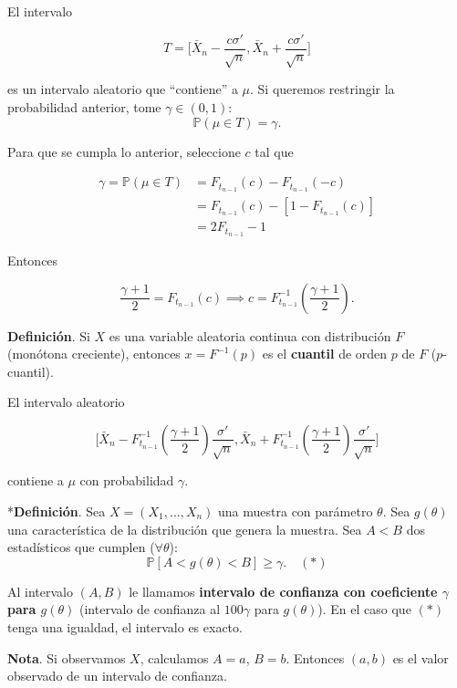 \documentclass[
  12pt,
]{book}
\begin{document}
El intervalo

\begin{equation*}
T = \bigg[\bar X_n - \dfrac{c\sigma'}{\sqrt n},\bar X_n + \dfrac{c\sigma'}{\sqrt
n}\bigg]
\end{equation*}

es un intervalo aleatorio que ``contiene'' a \(\mu\). Si queremos restringir la
probabilidad anterior, tome \(\gamma \in (0,1)\): \[ \mathbb P(\mu\in T) = \gamma. \]

Para que se cumpla lo anterior, seleccione \(c\) tal que

\begin{align*} \gamma = \mathbb P( \mu \in T) & = F_{t_{n-1}}(c)-F_{t_{n-1}}(-c)
\\ & = F_{t_{n-1}}(c) - [1-F_{t_{n-1}}(c)]\\ & = 2F_{t_{n-1}} - 1 \end{align*}

Entonces

\[ \dfrac{\gamma+1}2 = F_{t_{n-1}}(c) \implies c = F_{t_{n-1}}^{-1}\left(\dfrac{\gamma+1}2
\right). \]

\textbf{Definición}. Si \(X\) es una variable aleatoria continua con distribución \(F\)
(monótona creciente), entonces \(x=F^{-1}(p)\) es el \textbf{cuantil} de orden \(p\) de
\(F\) (\(p\)-cuantil).

El intervalo aleatorio

\begin{equation*}
\bigg[\bar X_n -
F_{t_{n-1}}^{-1}\left(\dfrac{\gamma+1}2 \right)\dfrac{\sigma'}{\sqrt n},\bar X_n
+ F_{t_{n-1}}^{-1}\left(\dfrac{\gamma+1}2 \right)\dfrac{\sigma'}{\sqrt
  n}\bigg]
\end{equation*}

contiene a \(\mu\) con probabilidad \(\gamma\).

*\textbf{Definición}. Sea \(X = (X_1,\dots,X_n)\) una muestra con parámetro \(\theta\).
Sea \(g(\theta)\) una característica de la distribución que genera la muestra. Sea \(A < B\) dos estadísticos que cumplen (\(\forall \theta\)):
\[
\mathbb P [A<g(\theta)<B]\geq \gamma.\quad
(*)
\]

Al intervalo \((A,B)\) le llamamos \textbf{intervalo de confianza con coeficiente
\(\gamma\) para \(g(\theta)\)} (intervalo de confianza al \(100\gamma\) para \(g(\theta)\)). En
el caso que \((*)\) tenga una igualdad, el intervalo es exacto.

\textbf{Nota}. Si observamos \(X\), calculamos \(A=a\), \(B=b\). Entonces \((a,b)\) es el
valor observado de un intervalo de confianza.
\end{document}
